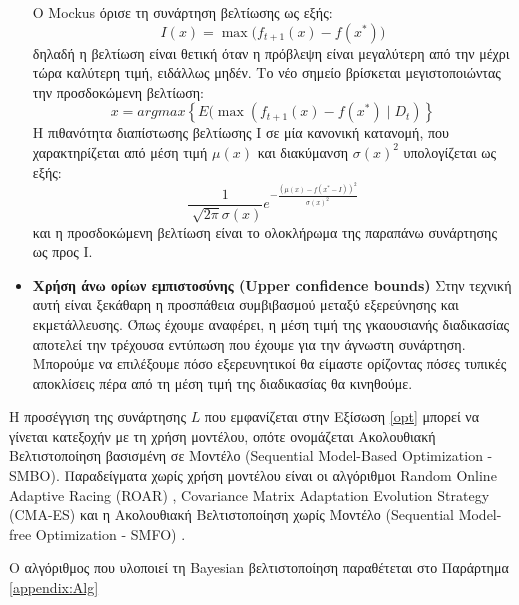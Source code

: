 \begin{itemize}
 		O Mockus όρισε τη συνάρτηση βελτίωσης ως εξής:
 		\begin{equation}
 		I(x)= \max \Big( f_{t+1} (x) - f(x^*) \Big)
 		\end{equation}
 		δηλαδή η βελτίωση είναι θετική όταν η πρόβλεψη είναι μεγαλύτερη από την μέχρι τώρα καλύτερη τιμή, ειδάλλως μηδέν. Το νέο σημείο βρίσκεται μεγιστοποιώντας την προσδοκώμενη βελτίωση:
 		\begin{equation}
 		x=argmax \left \{ E( \max( f_{t+1}(x) - f(x^*) \mid D_t) \right \}
 		\end{equation}
 		H πιθανότητα διαπίστωσης βελτίωσης I σε μία κανονική κατανομή, που χαρακτηρίζεται από μέση τιμή $\mu(x)$ και διακύμανση $\sigma(x)^2$ υπολογίζεται ως εξής:
 		\begin{equation}\frac{1}{\sqrt[]{2 \pi} \sigma(x)} e^{- \frac{(\mu(x)- f(x^*-I))^2}{\sigma(x)^2}}
 		\end{equation} 
 		και η προσδοκώμενη βελτίωση είναι το ολοκλήρωμα της παραπάνω συνάρτησης ως προς I.
 		\item \textbf{Χρήση άνω ορίων εμπιστοσύνης (Upper confidence bounds)} Στην τεχνική αυτή είναι ξεκάθαρη η προσπάθεια συμβιβασμού μεταξύ εξερεύνησης και εκμετάλλευσης. Όπως έχουμε αναφέρει, η μέση τιμή της γκαουσιανής διαδικασίας αποτελεί την τρέχουσα εντύπωση που έχουμε για την άγνωστη συνάρτηση. Μπορούμε να επιλέξουμε πόσο εξερευνητικοί θα είμαστε ορίζοντας πόσες τυπικές αποκλίσεις πέρα από τη μέση τιμή της διαδικασίας θα κινηθούμε.
 	\end{itemize} 	
 	
 	Η προσέγγιση της συνάρτησης $L$ που εμφανίζεται στην Εξίσωση \ref{opt} μπορεί να γίνεται κατεξοχήν με τη χρήση μοντέλου, οπότε ονομάζεται Ακολουθιακή Βελτιστοποίηση βασισμένη σε Μοντέλο (Sequential Model-Based Optimization - \gls{SMBO}). Παραδείγματα χωρίς χρήση μοντέλου είναι οι αλγόριθμοι Random Online Adaptive Racing (ROAR) \citep{Hutter2011}, Covari\-ance Matrix Adaptation Evolution Strategy (CMA-ES) \citep{DBLP:journals/corr/LoshchilovH16} και η Ακολουθιακή Βελτιστοποίηση χωρίς Μοντέλο (Sequential Model-free Optimization - \gls{SMFO})  \citep{7373431}. 
 	
 	
 Ο αλγόριθμος που υλοποιεί τη Bayesian βελτιστοποίηση παραθέτεται στο Παράρτημα \ref{appendix:Alg}
